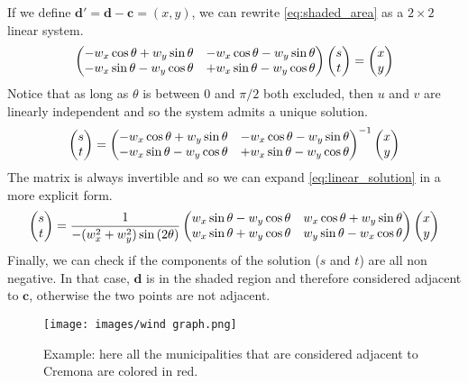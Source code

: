 \documentclass[11pt,a4paper]{article}
\begin{document}
If we define $\mathbf{d'} = \mathbf{d}-\mathbf{c} = (x,y)$, we can rewrite \eqref{eq:shaded_area} as a $2\times 2$ linear system.
\begin{align}
    \begin{pmatrix}
        -w_x\cos{\theta} + w_y\sin{\theta} & -w_x\cos{\theta} - w_y\sin{\theta}\cr
        -w_x\sin{\theta} - w_y\cos{\theta} & +w_x\sin{\theta} - w_y\cos{\theta}
    \end{pmatrix}
    \begin{pmatrix}
        s \cr
        t
    \end{pmatrix}=
    \begin{pmatrix}
        x \cr
        y
    \end{pmatrix}
\end{align}
Notice that as long as $\theta$ is between $0$ and $\pi/2$ both excluded, then $u$ and $v$ are linearly independent and so the system admits a unique solution.
\begin{align}
    \label{eq:linear_solution}
    \begin{pmatrix}
        s \cr
        t
    \end{pmatrix}=
    \begin{pmatrix}
        -w_x\cos{\theta} + w_y\sin{\theta} & -w_x\cos{\theta} - w_y\sin{\theta}\cr
        -w_x\sin{\theta} - w_y\cos{\theta} & +w_x\sin{\theta} - w_y\cos{\theta}
    \end{pmatrix}^{-1}
    \begin{pmatrix}
        x \cr
        y
    \end{pmatrix}
\end{align}
The matrix is always invertible and so we can expand \eqref{eq:linear_solution} in a more explicit form.
\begin{align}
    \begin{pmatrix}
        s \cr
        t
    \end{pmatrix}=
    \frac{1}{-(w_x^2+w_y^2)\sin{(2\theta)}}
    \begin{pmatrix}
        w_x\sin{\theta} - w_y\cos{\theta} & w_x\cos{\theta} + w_y\sin{\theta}\cr
        w_x\sin{\theta} + w_y\cos{\theta} & w_y\sin{\theta}-w_x\cos{\theta}
    \end{pmatrix}
    \begin{pmatrix}
        x \cr
        y
    \end{pmatrix}
\end{align}
Finally, we can check if the components of the solution ($s$ and $t$) are all non negative. In that case, $\mathbf{d}$ is in the shaded region and therefore considered adjacent to $\mathbf{c}$, otherwise the two points are not adjacent.
\begin{figure}[H]
    \centering
    \texttt{[image: images/wind graph.png]}
    \captionsetup{format=hang}
    \caption{Example: here all the municipalities that are considered adjacent to Cremona are colored in red.}
    \label{windAdjacency}
\end{figure}
\newpage
\end{document}
